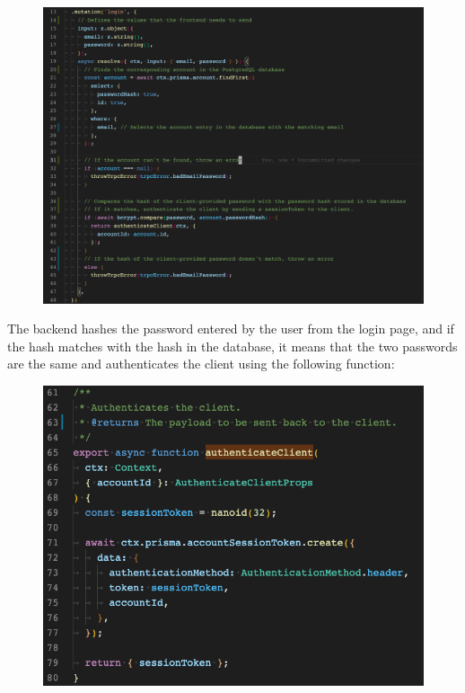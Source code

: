 \documentclass[notitlepage, 12pt]{report}
\begin{document}
\begin{figure}[H]
	\centering
	\includegraphics[width=\textwidth]{backend-login-function.png}
\end{figure}

The backend hashes the password entered by the user from the login page, and if the hash matches with the hash in the database, it means that the two passwords are the same and authenticates the client using the following function:

\begin{figure}[H]
	\includegraphics[width=\textwidth]{authenticate-client.png}
\end{figure}
\end{document}
